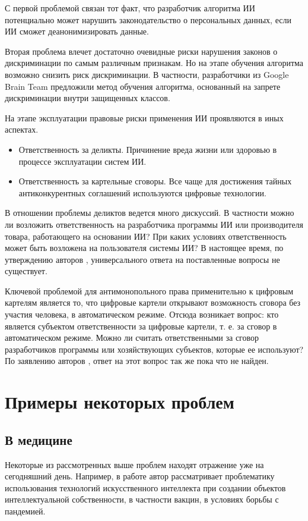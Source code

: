 С первой проблемой связан тот факт, что разработчик алгоритма ИИ потенциально может нарушить законодательство
о персональных данных, если ИИ сможет деанонимизировать данные.

Вторая проблема влечет достаточно очевидные риски нарушения законов о дискриминации по самым различным признакам.
Но на этапе обучения алгоритма возможно снизить риск
дискриминации. В частности, разработчики из Google Brain Team предложили метод обучения алгоритма,
основанный на запрете дискриминации внутри защищенных классов.

На этапе эксплуатации правовые риски применения ИИ проявляются в иных аспектах.

\begin{itemize}
\item Ответственность за деликты. Причинение вреда жизни или здоровью в процессе эксплуатации систем ИИ.
\item Ответственность за картельные сговоры. Все чаще для достижения тайных антиконкурентных соглашений
используются цифровые технологии.
\end{itemize}

В отношении проблемы деликтов ведется много дискуссий. В частности можно ли возложить ответственность на
разработчика программы ИИ или производителя товара, работающего на основании ИИ? При каких условиях
ответственность может быть возложена на пользователя системы ИИ? В настоящее время, по
утверждению авторов \cite{self}, универсального ответа на поставленные вопросы не существует.

Ключевой проблемой для антимонопольного права применительно к цифровым картелям является то,
что цифровые картели открывают возможность сговора без участия человека, в автоматическом режиме.
Отсюда возникает вопрос: кто является субъектом ответственности за цифровые картели, т. е. за сговор
в автоматическом режиме. Можно ли считать ответственными за сговор разработчиков программы или
хозяйствующих субъектов, которые ее используют? По заявлению авторов \cite{self}, ответ на этот вопрос
так же пока что не найден.
\newpage

\section{Примеры некоторых проблем}
\subsection{В медицине}
Некоторые из рассмотренных выше проблем находят отражение уже на сегодняшний день. Например,
в работе \cite{vac} автор рассматривает проблематику использования технологий искусственного
интеллекта при создании объектов интеллектуальной собственности, в частности вакцин, в условиях
борьбы с пандемией.

